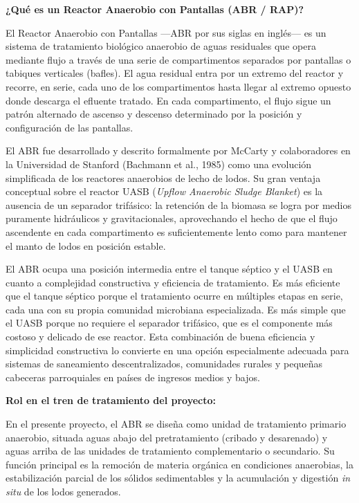 \documentclass[12pt,a4paper]{article}
\begin{document}
\textbf{¿Qué es un Reactor Anaerobio con Pantallas (ABR / RAP)?}

El Reactor Anaerobio con Pantallas —ABR por sus siglas en inglés— es un sistema de tratamiento biológico anaerobio de aguas residuales que opera mediante flujo a través de una serie de compartimentos separados por pantallas o tabiques verticales (bafles). El agua residual entra por un extremo del reactor y recorre, en serie, cada uno de los compartimentos hasta llegar al extremo opuesto donde descarga el efluente tratado. En cada compartimento, el flujo sigue un patrón alternado de ascenso y descenso determinado por la posición y configuración de las pantallas.

El ABR fue desarrollado y descrito formalmente por McCarty y colaboradores en la Universidad de Stanford (Bachmann et al., 1985) como una evolución simplificada de los reactores anaerobios de lecho de lodos. Su gran ventaja conceptual sobre el reactor UASB (\textit{Upflow Anaerobic Sludge Blanket}) es la ausencia de un separador trifásico: la retención de la biomasa se logra por medios puramente hidráulicos y gravitacionales, aprovechando el hecho de que el flujo ascendente en cada compartimento es suficientemente lento como para mantener el manto de lodos en posición estable.

El ABR ocupa una posición intermedia entre el tanque séptico y el UASB en cuanto a complejidad constructiva y eficiencia de tratamiento. Es más eficiente que el tanque séptico porque el tratamiento ocurre en múltiples etapas en serie, cada una con su propia comunidad microbiana especializada. Es más simple que el UASB porque no requiere el separador trifásico, que es el componente más costoso y delicado de ese reactor. Esta combinación de buena eficiencia y simplicidad constructiva lo convierte en una opción especialmente adecuada para sistemas de saneamiento descentralizados, comunidades rurales y pequeñas cabeceras parroquiales en países de ingresos medios y bajos.

\textbf{Rol en el tren de tratamiento del proyecto:}

En el presente proyecto, el ABR se diseña como unidad de tratamiento primario anaerobio, situada aguas abajo del pretratamiento (cribado y desarenado) y aguas arriba de las unidades de tratamiento complementario o secundario. Su función principal es la remoción de materia orgánica en condiciones anaerobias, la estabilización parcial de los sólidos sedimentables y la acumulación y digestión \textit{in situ} de los lodos generados.
\end{document}
